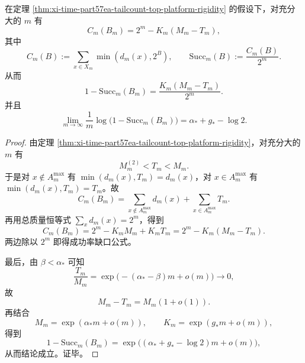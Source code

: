 \begin{theorem}[预言机容量缺口的顶端精确公式]\label{thm:xi-time-part57ea-oracle-capacity-defect-top-formula}
在定理 \ref{thm:xi-time-part57ea-tailcount-top-platform-rigidity} 的假设下，对充分大的 \(m\) 有
\[
\boxed{\;
C_m(B_m)=2^m-K_m(M_m-T_m),\;}
\]
其中
\[
C_m(B):=\sum_{x\in X_m}\min(d_m(x),2^B),
\qquad
\mathrm{Succ}_m(B):=\frac{C_m(B)}{2^m}.
\]
从而
\[
\boxed{\;
1-\mathrm{Succ}_m(B_m)
=
\frac{K_m(M_m-T_m)}{2^m}.\;}
\]
并且
\[
\boxed{\;
\lim_{m\to\infty}\frac1m
\log\bigl(1-\mathrm{Succ}_m(B_m)\bigr)
=
\alpha_*+g_*-\log 2.\;}
\]
\end{theorem}
\begin{proof}
由定理 \ref{thm:xi-time-part57ea-tailcount-top-platform-rigidity}，对充分大的 \(m\) 有
\[
M_m^{(2)}<T_m<M_m.
\]
于是对 \(x\notin A_m^{\max}\) 有 \(\min(d_m(x),T_m)=d_m(x)\)，对 \(x\in A_m^{\max}\) 有 \(\min(d_m(x),T_m)=T_m\)。故
\[
C_m(B_m)
=
\sum_{x\notin A_m^{\max}}d_m(x)+\sum_{x\in A_m^{\max}}T_m.
\]
再用总质量恒等式 \(\sum_x d_m(x)=2^m\)，得到
\[
C_m(B_m)=2^m-K_mM_m+K_mT_m
=
2^m-K_m(M_m-T_m).
\]
两边除以 \(2^m\) 即得成功率缺口公式。

最后，由 \(\beta<\alpha_*\) 可知
\[
\frac{T_m}{M_m}
=
\exp\!\bigl(-(\alpha_*-\beta)m+o(m)\bigr)\to 0,
\]
故
\[
M_m-T_m=M_m(1+o(1)).
\]
再结合
\[
M_m=\exp(\alpha_*m+o(m)),
\qquad
K_m=\exp(g_*m+o(m)),
\]
得到
\[
1-\mathrm{Succ}_m(B_m)
=
\exp\!\bigl((\alpha_*+g_*-\log 2)m+o(m)\bigr),
\]
从而结论成立。证毕。
\end{proof}


